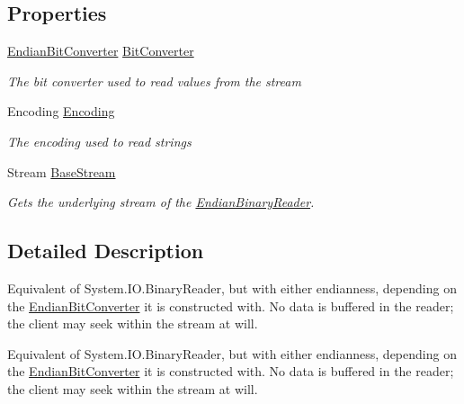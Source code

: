 \subsection*{Properties}
\begin{DoxyCompactItemize}
\item 
\mbox{\hyperlink{class_t_net_1_1_i_o_1_1_endian_bit_converter}{Endian\+Bit\+Converter}} \mbox{\hyperlink{class_t_net_1_1_i_o_1_1_endian_binary_reader_a903e43c694cca98444db4d072d520b62}{Bit\+Converter}}
\begin{DoxyCompactList}\small\item\em The bit converter used to read values from the stream \end{DoxyCompactList}\item 
Encoding \mbox{\hyperlink{class_t_net_1_1_i_o_1_1_endian_binary_reader_acd6eb5fbc4f1ce36f7ba50c1b3fc2d8d}{Encoding}}
\begin{DoxyCompactList}\small\item\em The encoding used to read strings \end{DoxyCompactList}\item 
Stream \mbox{\hyperlink{class_t_net_1_1_i_o_1_1_endian_binary_reader_a610b56aeb9ffefa9b1354880e5e7cc91}{Base\+Stream}}
\begin{DoxyCompactList}\small\item\em Gets the underlying stream of the \mbox{\hyperlink{class_t_net_1_1_i_o_1_1_endian_binary_reader}{Endian\+Binary\+Reader}}. \end{DoxyCompactList}\end{DoxyCompactItemize}


\subsection{Detailed Description}
Equivalent of System.\+I\+O.\+Binary\+Reader, but with either endianness, depending on the \mbox{\hyperlink{class_t_net_1_1_i_o_1_1_endian_bit_converter}{Endian\+Bit\+Converter}} it is constructed with. No data is buffered in the reader; the client may seek within the stream at will. 

Equivalent of System.\+I\+O.\+Binary\+Reader, but with either endianness, depending on the \mbox{\hyperlink{class_t_net_1_1_i_o_1_1_endian_bit_converter}{Endian\+Bit\+Converter}} it is constructed with. No data is buffered in the reader; the client may seek within the stream at will. 

